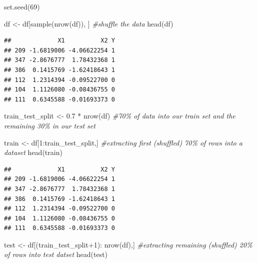 \documentclass[
]{article}
\newenvironment{Shaded}{\begin{snugshade}}{\end{snugshade}}
\newcommand{\CommentTok}[1]{\textcolor[rgb]{0.56,0.35,0.01}{\textit{#1}}}
\newcommand{\DecValTok}[1]{\textcolor[rgb]{0.00,0.00,0.81}{#1}}
\newcommand{\FloatTok}[1]{\textcolor[rgb]{0.00,0.00,0.81}{#1}}
\newcommand{\FunctionTok}[1]{\textcolor[rgb]{0.00,0.00,0.00}{#1}}
\newcommand{\NormalTok}[1]{#1}
\newcommand{\OtherTok}[1]{\textcolor[rgb]{0.56,0.35,0.01}{#1}}
\newcommand{\SpecialCharTok}[1]{\textcolor[rgb]{0.00,0.00,0.00}{#1}}
\begin{document}
\begin{Shaded}
\begin{Highlighting}[]
\FunctionTok{set.seed}\NormalTok{(}\DecValTok{69}\NormalTok{)}

\NormalTok{df }\OtherTok{\textless{}{-}}\NormalTok{ df[}\FunctionTok{sample}\NormalTok{(}\FunctionTok{nrow}\NormalTok{(df)), ]  }\CommentTok{\#shuffle the data}
\FunctionTok{head}\NormalTok{(df)}
\end{Highlighting}
\end{Shaded}

\begin{verbatim}
##             X1          X2 Y
## 209 -1.6819006 -4.06622254 1
## 347 -2.8676777  1.78432368 1
## 386  0.1415769 -1.62418643 1
## 112  1.2314394 -0.09522700 0
## 104  1.1126080 -0.08436755 0
## 111  0.6345588 -0.01693373 0
\end{verbatim}

\begin{Shaded}
\begin{Highlighting}[]
\NormalTok{train\_test\_split }\OtherTok{\textless{}{-}} \FloatTok{0.7} \SpecialCharTok{*} \FunctionTok{nrow}\NormalTok{(df)  }\CommentTok{\#70\% of data into our train set and the remaining 30\% in our test set}

\NormalTok{train }\OtherTok{\textless{}{-}}\NormalTok{ df[}\DecValTok{1}\SpecialCharTok{:}\NormalTok{train\_test\_split,]  }\CommentTok{\#extracting first (shuffled) 70\% of rows into a dataset}
\FunctionTok{head}\NormalTok{(train)}
\end{Highlighting}
\end{Shaded}

\begin{verbatim}
##             X1          X2 Y
## 209 -1.6819006 -4.06622254 1
## 347 -2.8676777  1.78432368 1
## 386  0.1415769 -1.62418643 1
## 112  1.2314394 -0.09522700 0
## 104  1.1126080 -0.08436755 0
## 111  0.6345588 -0.01693373 0
\end{verbatim}

\begin{Shaded}
\begin{Highlighting}[]
\NormalTok{test }\OtherTok{\textless{}{-}}\NormalTok{ df[(train\_test\_split}\SpecialCharTok{+}\DecValTok{1}\NormalTok{)}\SpecialCharTok{:} \FunctionTok{nrow}\NormalTok{(df),] }\CommentTok{\#extracting remaining (shuffled) 20\% of rows into test datset}
\FunctionTok{head}\NormalTok{(test)}
\end{Highlighting}
\end{Shaded}
\end{document}
